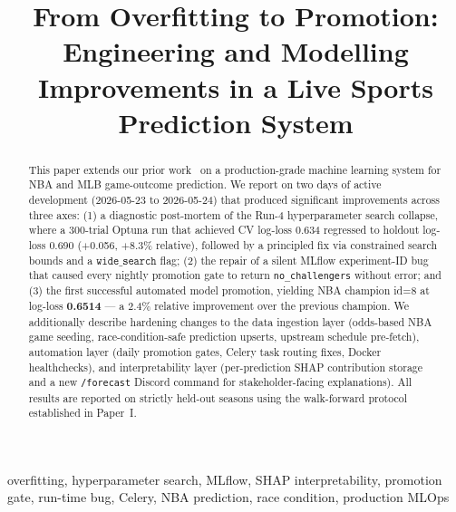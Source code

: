 \documentclass[conference]{IEEEtran}
\begin{document}
\title{From Overfitting to Promotion: Engineering and Modelling\\
Improvements in a Live Sports Prediction System}

\author{
}

\maketitle

\begin{abstract}
This paper extends our prior work~\cite{paper1} on a production-grade
machine learning system for NBA and MLB game-outcome prediction.
We report on two days of active development (2026-05-23 to 2026-05-24) that produced significant
improvements across three axes: (1) a diagnostic post-mortem of the
Run-4 hyperparameter search collapse, where a 300-trial Optuna run
that achieved CV log-loss 0.634 regressed to holdout log-loss 0.690
($+$0.056, $+$8.3\% relative), followed by a principled fix via
constrained search bounds and a $\texttt{wide\_search}$ flag; (2) the
repair of a silent MLflow experiment-ID bug that caused every nightly
promotion gate to return \texttt{no\_challengers} without error; and
(3) the first successful automated model promotion, yielding NBA
champion id=8 at log-loss \textbf{0.6514} — a 2.4\% relative
improvement over the previous champion.  We additionally describe
hardening changes to the data ingestion layer (odds-based NBA game
seeding, race-condition-safe prediction upserts, upstream schedule
pre-fetch), automation layer (daily promotion gates, Celery task
routing fixes, Docker healthchecks), and interpretability layer
(per-prediction SHAP contribution storage and a new
\texttt{/forecast} Discord command for stakeholder-facing explanations).
All results are reported on strictly held-out seasons using the
walk-forward protocol established in Paper~I.
\end{abstract}

\begin{IEEEkeywords}
overfitting, hyperparameter search, MLflow, SHAP interpretability,
promotion gate, run-time bug, Celery, NBA prediction, race condition,
production MLOps
\end{IEEEkeywords}

\end{document}
